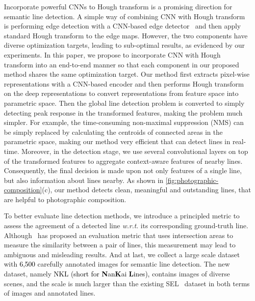 \documentclass[10pt,journal,cspaper,compsoc]{IEEEtran}
\newcommand{\revise}[1]{{\textcolor{black}{#1}}}
\begin{document}
Incorporate powerful CNNs to Hough transform is a promising direction for
semantic line detection.
A simple way of combining CNN with Hough transform is performing edge detection 
with a CNN-based edge detector~\cite{RcfEdgePami2019,xie2015holistically}
and then apply standard Hough transform to the edge maps.
However, the two components have diverse optimization targets, leading to sub-optimal results, as
evidenced by our experiments.
In this paper, we propose to incorporate CNN with Hough transform into an end-to-end manner
so that each component in our proposed method shares the same optimization target.
Our method first extracts pixel-wise representations with a CNN-based encoder
and then performs Hough transform on the deep representations to convert representations
from feature space into parametric space.
Then the global line detection problem is converted to simply detecting peak response in
the transformed features, making the problem much simpler.
For example, the time-consuming non-maximal suppression (NMS) can be simply
replaced by calculating the centroids of connected areas in the parametric space, 
making our method very efficient that can detect lines in real-time.
Moreover, in the detection stage, we use several convolutional layers on
top of the transformed features to aggregate context-aware features of nearby lines.
Consequently, the final decision is made upon not only features of a single line,
but also information about lines nearby.
As shown in \cref{fig:photographic-composition}(c), 
our method detects clean, meaningful and outstanding lines,
that are helpful to photographic composition.


To better evaluate line detection methods, we introduce a principled metric to assess
the agreement of a detected line \textsl{w.r.t.} its corresponding ground-truth line.
Although~\cite{lee2017semantic} has proposed an evaluation metric that uses intersection areas to measure the similarity between a pair of lines,
this measurement may lead to ambiguous and misleading results.
And at last, we collect a large scale dataset with \revise{6,500} carefully annotated images for semantic
line detection.
The new dataset, namely \revise{NKL (short for \textbf{N}an\textbf{K}ai \textbf{L}ines),}
contains images of diverse scenes,
and the scale is much larger than the existing SEL~\cite{lee2017semantic} dataset
in both terms of images and annotated lines.
\end{document}
